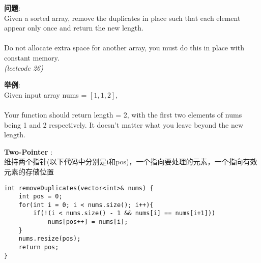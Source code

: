     
\begin{description}
    \item{\textbf{问题}}:\\
Given a sorted array, remove the duplicates in place such that each element appear only once and return the new length.\\
\\
Do not allocate extra space for another array, you must do this in place with constant memory.\\
\textit{(leetcode 26)}
    \item{\textbf{举例}}:\\
Given input array nums = $[1,1,2]$,\\
\\
Your function should return length = 2, with the first two elements of nums being 1 and 2 respectively. It doesn't matter what you leave beyond the new length.
    \item{\textbf{Two-Pointer}} : 
    \\维持两个指针(以下代码中分别是i和pos)，一个指向要处理的元素，一个指向有效元素的存储位置
    \begin{lstlisting}
int removeDuplicates(vector<int>& nums) {
	int pos = 0;
	for(int i = 0; i < nums.size(); i++){
		if(!(i < nums.size() - 1 && nums[i] == nums[i+1]))
			nums[pos++] = nums[i];
	}
	nums.resize(pos);
	return pos;
}
    \end{lstlisting}
\end{description}
